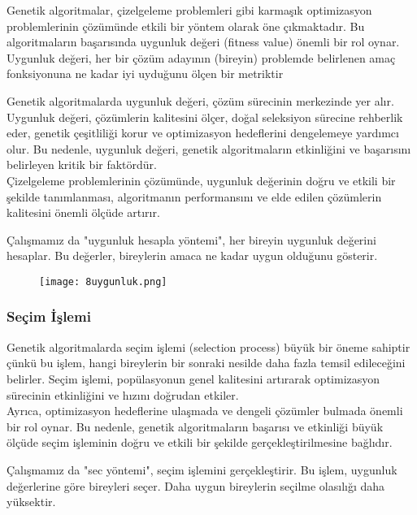 \documentclass[12pt, a4paper]{article}
\begin{document}
\begin{flushleft}
\item Genetik algoritmalar, çizelgeleme problemleri gibi karmaşık optimizasyon problemlerinin çözümünde etkili bir yöntem olarak öne çıkmaktadır. Bu algoritmaların başarısında uygunluk değeri (fitness value) önemli bir rol oynar. Uygunluk değeri, her bir çözüm adayının (bireyin) problemde belirlenen amaç fonksiyonuna ne kadar iyi uyduğunu ölçen bir metriktir
\item Genetik algoritmalarda uygunluk değeri, çözüm sürecinin merkezinde yer alır. Uygunluk değeri, çözümlerin kalitesini ölçer, doğal seleksiyon sürecine rehberlik eder, genetik çeşitliliği korur ve optimizasyon hedeflerini dengelemeye yardımcı olur. Bu nedenle, uygunluk değeri, genetik algoritmaların etkinliğini ve başarısını belirleyen kritik bir faktördür.\\ Çizelgeleme problemlerinin çözümünde, uygunluk değerinin doğru ve etkili bir şekilde tanımlanması, algoritmanın performansını ve elde edilen çözümlerin kalitesini önemli ölçüde artırır.

\item Çalışmamız da "uygunluk hesapla yöntemi", her bireyin uygunluk değerini hesaplar. Bu değerler, bireylerin amaca ne kadar uygun olduğunu gösterir.\\[10pt]



\begin{figure}[!h]
	\centering
	\texttt{[image: 8uygunluk.png]}
	
\end{figure}
\subsubsection{Seçim İşlemi}

\item Genetik algoritmalarda seçim işlemi (selection process) büyük bir öneme sahiptir çünkü bu işlem, hangi bireylerin bir sonraki nesilde daha fazla temsil edileceğini belirler. Seçim işlemi, popülasyonun genel kalitesini artırarak optimizasyon sürecinin etkinliğini ve hızını doğrudan etkiler.\\
Ayrıca, optimizasyon hedeflerine ulaşmada ve dengeli çözümler bulmada önemli bir rol oynar. Bu nedenle, genetik algoritmaların başarısı ve etkinliği büyük ölçüde seçim işleminin doğru ve etkili bir şekilde gerçekleştirilmesine bağlıdır.
\item Çalışmamız da "sec yöntemi", seçim işlemini gerçekleştirir. Bu işlem, uygunluk değerlerine göre bireyleri seçer. Daha uygun bireylerin seçilme olasılığı daha yüksektir.




\end{flushleft}
\end{document}
